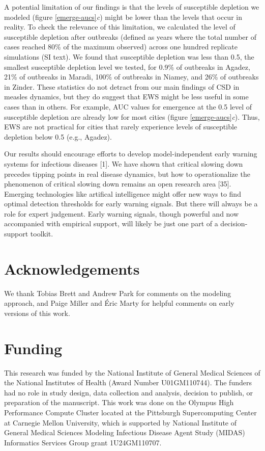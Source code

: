 \documentclass[3p]{elsarticle} %
\begin{document}
A potential limitation of our findings is that the levels of susceptible
depletion we modeled (figure \ref{emerge-aucs}\emph{c}) might be lower
than the levels that occur in reality. To check the relevance of this
limitation, we calculated the level of susceptible depletion after
outbreaks (defined as years where the total number of cases reached 80\%
of the maximum observed) across one hundred replicate simulations (SI
text). We found that susceptible depletion was less than 0.5, the
smallest susceptible depletion level we tested, for 0.9\% of outbreaks
in Agadez, 21\% of outbreaks in Maradi, 100\% of outbreaks in Niamey,
and 26\% of outbreaks in Zinder. These statistics do not detract from
our main findings of CSD in measles dynamics, but they do suggest that
EWS might be less useful in some cases than in others. For example, AUC
values for emergence at the 0.5 level of susceptible depletion are
already low for most cities (figure \ref{emerge-aucs}\emph{c}). Thus,
EWS are not practical for cities that rarely experience levels of
susceptible depletion below 0.5 (e.g., Agadez).

Our results should encourage efforts to develop model-independent early
warning systems for infectious diseases {[}1{]}. We have shown that
critical slowing down precedes tipping points in real disease dynamics,
but how to operationalize the phenomenon of critical slowing down
remains an open research area {[}35{]}. Emerging technologies like
artifical intelligence might offer new ways to find optimal detection
thresholds for early warning signals. But there will always be a role
for expert judgement. Early warning signals, though powerful and now
accompanied with empirical support, will likely be just one part of a
decision-support toolkit.

\hypertarget{acknowledgements}{%
\section{Acknowledgements}\label{acknowledgements}}

We thank Tobias Brett and Andrew Park for comments on the modeling
approach, and Paige Miller and Éric Marty for helpful comments on early
versions of this work.

\hypertarget{funding}{%
\section{Funding}\label{funding}}

This research was funded by the National Institute of General Medical
Sciences of the National Institutes of Health (Award Number
U01GM110744). The funders had no role in study design, data collection
and analysis, decision to publish, or preparation of the manuscript.
This work was done on the Olympus High Performance Compute Cluster
located at the Pittsburgh Supercomputing Center at Carnegie Mellon
University, which is supported by National Institute of General Medical
Sciences Modeling Infectious Disease Agent Study (MIDAS) Informatics
Services Group grant 1U24GM110707.
\end{document}
